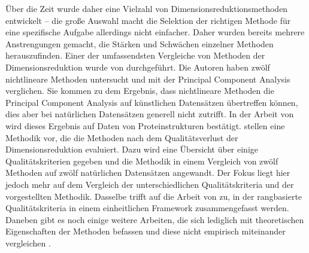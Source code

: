 Über die Zeit wurde daher eine Vielzahl von Dimensionsreduktionsmethoden entwickelt \parencite[siehe z.B.][]{Lee.2007} -- die große Auswahl macht die Selektion der richtigen Methode für
eine spezifische Aufgabe allerdings nicht einfacher. Daher wurden bereits mehrere Anstrengungen
gemacht, die Stärken und Schwächen einzelner Methoden herauszufinden. Einer der umfassendsten
Vergleiche von Methoden der Dimensionsreduktion wurde von \Textcite{vanderMaaten.2009}
durchgeführt. Die Autoren haben zwölf nichtlineare Methoden untersucht und mit der Principal
Component Analysis verglichen. Sie kommen zu dem Ergebnis, dass nichtlineare Methoden die Principal
Component Analysis auf künstlichen Datensätzen übertreffen können, dies aber bei natürlichen
Datensätzen generell nicht zutrifft. In der Arbeit von \textcite{RohanPandit.2016} wird dieses
Ergebnis auf Daten von Proteinstrukturen bestätigt. \Textcite{Gracia.2014} stellen eine Methodik
vor, die die Methoden nach dem Qualitätsverlust der Dimensionsreduktion evaluiert. Dazu wird eine
Übersicht über einige Qualitätskriterien gegeben und die Methodik in einem Vergleich von zwölf
Methoden auf zwölf natürlichen Datensätzen angewandt. Der Fokus liegt hier jedoch mehr auf dem
Vergleich der unterschiedlichen Qualitätskriteria und der vorgestellten Methodik. Dasselbe trifft
auf die Arbeit von \textcite{Lee.2009} zu, in der rangbasierte Qualitätskriteria in einem
einheitlichen Framework zusammengefasst werden. Daneben gibt es noch einige weitere Arbeiten, die
sich lediglich mit theoretischen Eigenschaften der Methoden befassen und diese nicht empirisch
miteinander vergleichen \parencites{Cunningham.2014}{Sorzano.2014}{Lee.2007}{Sarveniazi.2014}{Burges.2009b}.

